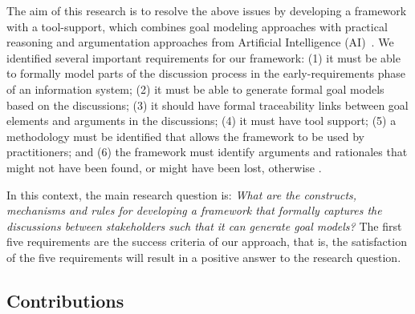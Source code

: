 \begin{enumerate}
\end{enumerate}
 
The aim of this research is to resolve the above issues by developing a framework with a tool-support, which combines goal modeling approaches with practical reasoning and argumentation approaches from Artificial Intelligence (AI)~\cite{atkinson2007}. We identified several important requirements for our framework: (1) it must be able to formally model parts of the discussion process in the early-requirements phase of an information system; (2) it must be able to generate formal goal models based on the discussions; (3) it should have formal traceability links between goal elements and arguments in the discussions; (4) it must have tool support; (5) a methodology must be identified that allows the framework to be used by practitioners; and (6) the framework must identify arguments and rationales that might not have been found, or might have been lost, otherwise %
 . 

In this context, the main research question is: \emph{What are the constructs, mechanisms and rules for developing a framework that formally captures the discussions between stakeholders such that it can generate goal models?} The first five requirements are the success criteria of our approach, that is, the satisfaction of the five requirements will result in a positive answer to the research question. %


\subsection{Contributions} 

